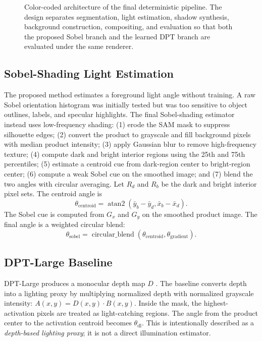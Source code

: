 \documentclass{article}
\begin{document}
\begin{figure}[H]
{}
\caption{Color-coded architecture of the final deterministic pipeline. The design separates segmentation, light estimation, shadow synthesis, background construction, compositing, and evaluation so that both the proposed Sobel branch and the learned DPT branch are evaluated under the same renderer.}
\label{fig:pipeline}
\end{figure}

\subsection{Sobel-Shading Light Estimation}
The proposed method estimates a foreground light angle without training. A raw Sobel orientation histogram was initially tested but was too sensitive to object outlines, labels, and specular highlights. The final Sobel-shading estimator instead uses low-frequency shading: (1) erode the SAM mask to suppress silhouette edges; (2) convert the product to grayscale and fill background pixels with median product intensity; (3) apply Gaussian blur to remove high-frequency texture; (4) compute dark and bright interior regions using the 25th and 75th percentiles; (5) estimate a centroid cue from dark-region center to bright-region center; (6) compute a weak Sobel cue on the smoothed image; and (7) blend the two angles with circular averaging. Let $R_d$ and $R_b$ be the dark and bright interior pixel sets. The centroid angle is
\begin{equation}
    \theta_{\mathrm{centroid}} =
    \operatorname{atan2}(\bar{y}_{b}-\bar{y}_{d}, \bar{x}_{b}-\bar{x}_{d}).
\end{equation}
The Sobel cue is computed from $G_x$ and $G_y$ on the smoothed product image. The final angle is a weighted circular blend:
\begin{equation}
    \theta_{\mathrm{sobel}} =
    \operatorname{circular\_blend}(\theta_{\mathrm{centroid}}, \theta_{\mathrm{gradient}}).
\end{equation}

\subsection{DPT-Large Baseline}
DPT-Large produces a monocular depth map $D$ \citep{ranftl2021dpt}. The baseline converts depth into a lighting proxy by multiplying normalized depth with normalized grayscale intensity: $A(x,y) = D(x,y) \cdot B(x,y).$ Inside the mask, the highest-activation pixels are treated as light-catching regions. The angle from the product center to the activation centroid becomes $\theta_{\mathrm{dl}}$. This is intentionally described as a \emph{depth-based lighting proxy}; it is not a direct illumination estimator.
\end{document}
